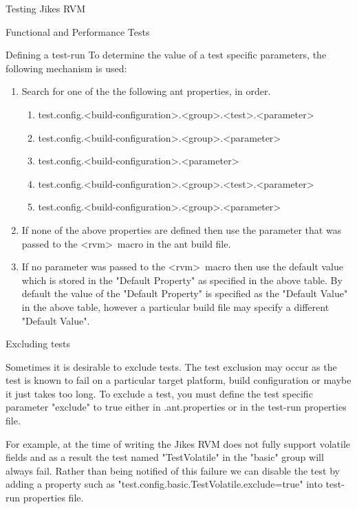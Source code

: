 \begin{section}{Testing Jikes RVM}
\begin{subsection}{Functional and Performance Tests}
\begin{subsubsection}{Defining a test-run}
To determine the value of a test specific parameters, the following mechanism is used:

\begin{enumerate}
  \item    Search for one of the the following ant properties, in order.
    \begin{enumerate}
        \item test.config.\textless build-configuration\textgreater .\textless group\textgreater .\textless test\textgreater .\textless parameter\textgreater 
        \item test.config.\textless build-configuration\textgreater .\textless group\textgreater .\textless parameter\textgreater 
        \item test.config.\textless build-configuration\textgreater .\textless parameter\textgreater 
        \item test.config.\textless build-configuration\textgreater .\textless group\textgreater .\textless test\textgreater .\textless parameter\textgreater 
        \item test.config.\textless build-configuration\textgreater .\textless group\textgreater .\textless parameter\textgreater 
    \end{enumerate}
  \item If none of the above properties are defined then use the parameter that was passed to the \textless rvm\textgreater\ macro in the ant build file.
  \item If no parameter was passed to the \textless rvm\textgreater\ macro then use the default value which is stored in the "Default Property" as specified in the above table. By default the value of the "Default Property" is specified as the "Default Value" in the above table, however a particular build file may specify a different "Default Value".
\end{enumerate}

\end{subsubsection}

\begin{subsubsection}{Excluding tests}

Sometimes it is desirable to exclude tests. The test exclusion may occur as the test is known to fail on a particular target platform, build configuration or maybe it just takes too long. To exclude a test, you must define the test specific parameter "exclude" to true either in .ant.properties or in the test-run properties file.

For example, at the time of writing the Jikes RVM does not fully support volatile fields and as a result the test named "TestVolatile" in the "basic" group will always fail. Rather than being notified of this failure we can disable the test by adding a property such as "test.config.basic.TestVolatile.exclude=true" into test-run properties file.


\end{subsubsection}
\end{subsection}
\end{section}
